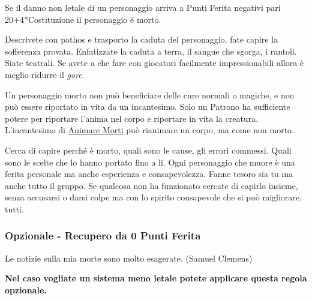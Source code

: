 \begin{multicols}{2}
Se il danno non letale di un personaggio arriva a Punti Ferita negativi pari 20+4*Costituzione il personaggio é morto.\hypertarget{puntiferitatemporaneimorte}{}

\begin{changemargin}{0.3cm}{0.3cm}\begin{narratore}
Descrivete con pathos e trasporto la caduta del personaggio, fate capire la sofferenza provata. Enfatizzate la caduta a terra, il sangue che sgorga, i rantoli. Siate teatrali.
Se avete a che fare con giocatori facilmente impressionabili allora è meglio ridurre il \emph{gore}.
\end{narratore}\end{changemargin}

Un personaggio morto non può beneficiare delle cure normali o magiche, e non può essere riportato in vita da un incantesimo. Solo un Patrono ha sufficiente potere per riportare l'anima nel corpo e riportare in vita la creatura. L'incantesimo di \hyperlink{Animare Morti}{Animare Morti} può rianimare un corpo, ma come non morto.

\begin{changemargin}{0.3cm}{0.3cm}\begin{tcolorbox}[title = La morte del personaggio]
Cerca di capire perché è morto, quali sono le cause, gli errori commessi. Quali sono le scelte che lo hanno portato fino a li. Ogni personaggio che muore è una ferita personale ma anche esperienza e consapevolezza. Fanne tesoro sia tu ma anche tutto il gruppo. Se qualcosa non ha funzionato cercate di capirlo insieme, senza accusarsi o darsi colpe ma con lo spirito consapevole che si può migliorare, tutti.
\end{tcolorbox}\end{changemargin}

\subsubsection{Opzionale - Recupero da 0 Punti Ferita}  \label{recuperozeropf}

\begin{changemargin}{0.3cm}{0.3cm}\begin{enfasi}{
Le notizie sulla mia morte sono molto esagerate. (Samuel Clemens)
}\end{enfasi}\end{changemargin}\medskip

\textbf{Nel caso vogliate un sistema meno letale potete applicare questa regola opzionale.}


\end{multicols}
